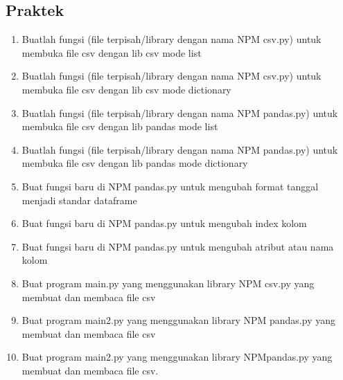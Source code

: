 \subsection{Praktek}
\begin{enumerate}

\item Buatlah fungsi (ﬁle terpisah/library dengan nama NPM csv.py) untuk membuka ﬁle csv dengan lib csv mode list


\item Buatlah fungsi (ﬁle terpisah/library dengan nama NPM csv.py) untuk membuka ﬁle csv dengan lib csv mode dictionary


\item Buatlah fungsi (ﬁle terpisah/library dengan nama NPM pandas.py) untuk membuka ﬁle csv dengan lib pandas mode list


\item Buatlah fungsi (ﬁle terpisah/library dengan nama NPM pandas.py) untuk membuka ﬁle csv dengan lib pandas mode dictionary


\item Buat fungsi baru di NPM pandas.py untuk mengubah format tanggal menjadi standar dataframe


\item Buat fungsi baru di NPM pandas.py untuk mengubah index kolom


\item Buat fungsi baru di NPM pandas.py untuk mengubah atribut atau nama kolom


\item Buat program main.py yang menggunakan library NPM csv.py yang membuat dan membaca ﬁle csv


\item Buat program main2.py yang menggunakan library NPM pandas.py yang membuat dan membaca ﬁle csv


\item Buat program main2.py yang menggunakan library NPMpandas.py yang membuat dan membaca file csv.


\end{enumerate}

